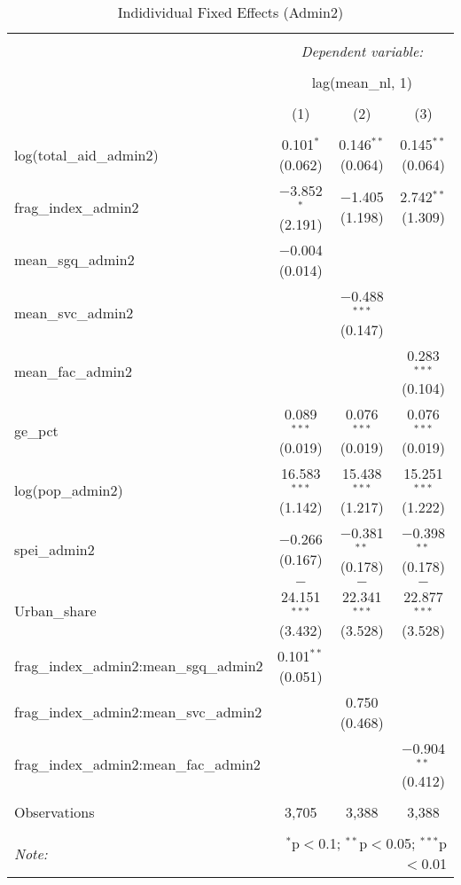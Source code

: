 
\begin{table}[!htbp] \centering 
  \caption{Indidividual Fixed Effects (Admin2)} 
  \label{} 
\begin{tabular}{@{\extracolsep{5pt}}lccc} 
\\[-1.8ex]\hline 
\hline \\[-1.8ex] 
 & \multicolumn{3}{c}{\textit{Dependent variable:}} \\ 
\cline{2-4} 
\\[-1.8ex] & \multicolumn{3}{c}{lag(mean\_nl, 1)} \\ 
\\[-1.8ex] & (1) & (2) & (3)\\ 
\hline \\[-1.8ex] 
 log(total\_aid\_admin2) & 0.101$^{*}$ (0.062) & 0.146$^{**}$ (0.064) & 0.145$^{**}$ (0.064) \\ 
  frag\_index\_admin2 & $-$3.852$^{*}$ (2.191) & $-$1.405 (1.198) & 2.742$^{**}$ (1.309) \\ 
  mean\_sgq\_admin2 & $-$0.004 (0.014) &  &  \\ 
  mean\_svc\_admin2 &  & $-$0.488$^{***}$ (0.147) &  \\ 
  mean\_fac\_admin2 &  &  & 0.283$^{***}$ (0.104) \\ 
  ge\_pct & 0.089$^{***}$ (0.019) & 0.076$^{***}$ (0.019) & 0.076$^{***}$ (0.019) \\ 
  log(pop\_admin2) & 16.583$^{***}$ (1.142) & 15.438$^{***}$ (1.217) & 15.251$^{***}$ (1.222) \\ 
  spei\_admin2 & $-$0.266 (0.167) & $-$0.381$^{**}$ (0.178) & $-$0.398$^{**}$ (0.178) \\ 
  Urban\_share & $-$24.151$^{***}$ (3.432) & $-$22.341$^{***}$ (3.528) & $-$22.877$^{***}$ (3.528) \\ 
  frag\_index\_admin2:mean\_sgq\_admin2 & 0.101$^{**}$ (0.051) &  &  \\ 
  frag\_index\_admin2:mean\_svc\_admin2 &  & 0.750 (0.468) &  \\ 
  frag\_index\_admin2:mean\_fac\_admin2 &  &  & $-$0.904$^{**}$ (0.412) \\ 
 \hline \\[-1.8ex] 
Observations & 3,705 & 3,388 & 3,388 \\ 
\hline 
\hline \\[-1.8ex] 
\textit{Note:}  & \multicolumn{3}{r}{$^{*}$p$<$0.1; $^{**}$p$<$0.05; $^{***}$p$<$0.01} \\ 
\end{tabular} 
\end{table} 

